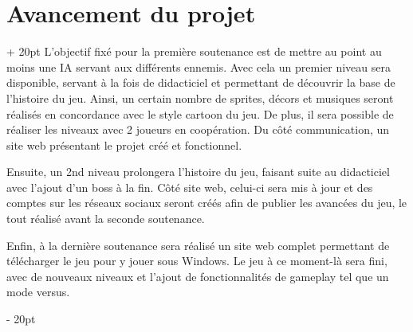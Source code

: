 \documentclass[a4paper, 12pt, twoside]{article}
\newcommand{\ind}[1][20pt]{\advance\leftskip + #1}
\newcommand{\deind}[1][20pt]{\advance\leftskip - #1}
\newenvironment{indt}[2][20pt]{#2 \par \ind[#1]}{\par \deind} %
\begin{document}

    \begin{indt}{\section{Avancement du projet}}
        L'objectif fixé pour la première soutenance est de mettre au point au moins une IA servant aux différents ennemis. Avec cela un premier niveau sera disponible, servant à la fois de didacticiel et permettant de découvrir la base de l'histoire du jeu. Ainsi, un certain nombre de sprites, décors et musiques seront réalisés en concordance avec le style cartoon du jeu. De plus, il sera possible de réaliser les niveaux avec 2 joueurs en coopération. Du côté communication, un site web présentant le projet créé et fonctionnel.

        Ensuite, un 2nd niveau prolongera l'histoire du jeu, faisant suite au didacticiel avec l'ajout d'un boss à la fin. Côté site web, celui-ci sera mis à jour et des comptes sur les réseaux sociaux seront créés afin de publier les avancées du jeu, le tout réalisé avant la seconde soutenance.

        Enfin, à la dernière soutenance sera réalisé un site web complet permettant de télécharger le jeu pour y jouer sous Windows. Le jeu à ce moment-là sera fini, avec de nouveaux niveaux et l'ajout de fonctionnalités de gameplay tel que un mode versus.


\end{indt}
\end{document}
